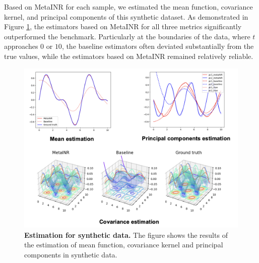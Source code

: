 \documentclass{article}
\begin{document}
Based on MetaINR for each sample, we estimated the mean function, covariance kernel, and principal components of this synthetic dataset. 
As demonstrated in Figure \ref{Estimation for synthetic data},
the estimators based on MetaINR for all three metrics significantly outperformed the benchmark. 
Particularly at the boundaries of the data, where $t$ approaches $0$ or $10$, 
the baseline estimators often deviated substantially from the true values,
while the estimators based on MetaINR remained relatively reliable.
\begin{figure}[htb]
  \centering
  \includegraphics[width=\textwidth]{estimation.png}
  \caption{\textbf{Estimation for synthetic data.} The figure shows the results of the estimation of mean function, covariance kernel and principal components in synthetic data. }
  \label{Estimation for synthetic data}
\end{figure}




\end{document}

